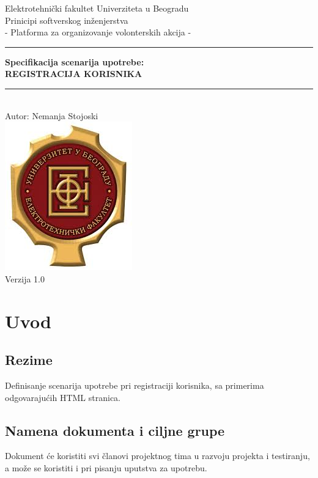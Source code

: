\documentclass[11pt,a4paper]{article}
\begin{document}
\begin{titlepage}

\centering
\textnormal{\large Elektrotehnički fakultet Univerziteta u Beogradu}\\[0.1cm]
\textnormal{\large Prinicipi softverskog inženjerstva}\\[3cm]

\textnormal{\normalsize - Platforma za organizovanje volonterskih akcija -}\\\vspace{-5mm}
\rule{\textwidth}{0.4pt}
{\huge \bfseries Specifikacija scenarija upotrebe:\\ 
REGISTRACIJA KORISNIKA\par}\vspace{-1mm}
\rule{\textwidth}{0.4pt}\\\vspace{1mm}
\textnormal{\large Autor: Nemanja Stojoski}\\[6cm]

\includegraphics[scale=0.5]{logo.jpg}\\
\vfill
\textnormal{\normalsize Verzija 1.0}\\

\end{titlepage}

\tableofcontents

\newpage

\section{Uvod}
\subsection{Rezime}
Definisanje scenarija upotrebe pri registraciji korisnika, sa primerima odgovarajućih HTML stranica.
\subsection{Namena dokumenta i ciljne grupe}
Dokument će koristiti svi članovi projektnog tima u razvoju projekta i testiranju, a može se koristiti i pri pisanju uputstva za upotrebu.
\end{document}
